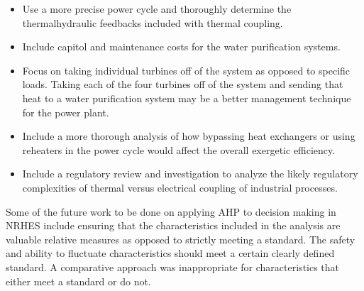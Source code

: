 \begin{itemize}
\item Use a more precise power cycle and thoroughly determine the thermalhydraulic feedbacks included with thermal coupling.
\item Include capitol and maintenance costs for the water purification systems.
\item Focus on taking individual turbines off of the system as opposed to specific loads.  Taking each of the four turbines off of the system and sending that heat to a water purification system may be a better management technique for the power plant.
\item Include a more thorough analysis of how bypassing heat exchangers or using reheaters in the power cycle would affect the overall exergetic efficiency.
\item Include a regulatory review and investigation to analyze the likely regulatory complexities of thermal versus electrical coupling of industrial processes.
\end{itemize}

Some of the future work to be done on applying AHP to decision making in NRHES include ensuring that the characteristics included in the analysis are valuable relative measures as opposed to strictly meeting a standard. The safety and ability to fluctuate characteristics should meet a certain clearly defined standard.  A comparative approach was inappropriate for characteristics that either meet a standard or do not.

